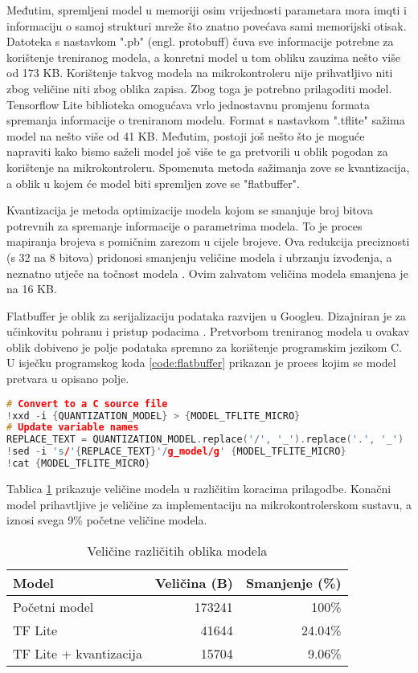 Međutim, spremljeni model u memoriji osim vrijednosti parametara mora imqti i informaciju 
o samoj strukturi mreže što znatno povećava sami memorijski otisak. Datoteka s nastavkom
".pb" (engl. protobuff) čuva sve informacije potrebne za korištenje treniranog modela,
a konretni model u tom obliku zauzima nešto više od 173 KB. Korištenje takvog modela
na mikrokontroleru nije prihvatljivo niti zbog veličine niti zbog oblika zapisa. Zbog 
toga je potrebno prilagoditi model. Tensorflow Lite biblioteka omogućava vrlo jednostavnu
promjenu formata spremanja informacije o treniranom modelu. Format s nastavkom ".tflite"
sažima model na nešto više od 41 KB. Međutim, postoji još nešto što je moguće napraviti
kako bismo saželi model još više te ga pretvorili u oblik pogodan za korištenje na
mikrokontroleru. Spomenuta metoda sažimanja zove se kvantizacija, a oblik u kojem će model
biti spremljen zove se "flatbuffer".

Kvantizacija je metoda optimizacije modela kojom se smanjuje broj bitova potrevnih za
spremanje informacije o parametrima modela. 
To je proces mapiranja brojeva s pomičnim zarezom u cijele brojeve.
Ova redukcija preciznosti (s 32 na 8 bitova)
pridonosi smanjenju veličine modela i ubrzanju izvođenja, a neznatno utječe na točnost
modela \cite{quantization}. Ovim zahvatom veličina modela smanjena je na 16 KB. 

Flatbuffer je oblik za serijalizaciju podataka razvijen u Googleu. Dizajniran je
za učinkovitu pohranu i pristup podacima \cite{flatbuffers_docs}. 
Pretvorbom treniranog modela u ovakav oblik
dobiveno je polje podataka spremno za korištenje programskim jezikom C.
U isječku programskog koda \ref{code:flatbuffer} prikazan je proces kojim se model pretvara u opisano 
polje.

\begin{lstlisting}[language=C++, caption=Pretvorba u Flatbuffer, label=code:flatbuffer]
# Convert to a C source file
!xxd -i {QUANTIZATION_MODEL} > {MODEL_TFLITE_MICRO}
# Update variable names
REPLACE_TEXT = QUANTIZATION_MODEL.replace('/', '_').replace('.', '_')
!sed -i 's/'{REPLACE_TEXT}'/g_model/g' {MODEL_TFLITE_MICRO}
!cat {MODEL_TFLITE_MICRO}
\end{lstlisting}

Tablica \ref{tab:model_sizes} prikazuje veličine modela u različitim koracima prilagodbe.
Konačni model prihavtljive je veličine za implementaciju na mikrokontrolerskom sustavu, 
a iznosi svega 9\% početne veličine modela.

\begin{table}[htb]
    \centering
    \begin{tabular}{|l|r|r|}
        \hline
        \textbf{Model} & \textbf{Veličina (B)} & \textbf{Smanjenje (\%)} \\ \hline
        Početni model & 173241 & 100\% \\ \hline
        TF Lite & 41644 & 24.04\% \\ \hline
        TF Lite + kvantizacija & 15704 & 9.06\% \\ \hline
    \end{tabular}
    \caption{Veličine različitih oblika modela}
    \label{tab:model_sizes}
\end{table}
